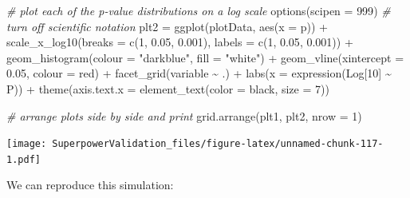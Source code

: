 \documentclass[
]{book}
\newenvironment{Shaded}{\begin{snugshade}}{\end{snugshade}}
\newcommand{\AttributeTok}[1]{\textcolor[rgb]{0.77,0.63,0.00}{#1}}
\newcommand{\CommentTok}[1]{\textcolor[rgb]{0.56,0.35,0.01}{\textit{#1}}}
\newcommand{\DecValTok}[1]{\textcolor[rgb]{0.00,0.00,0.81}{#1}}
\newcommand{\FloatTok}[1]{\textcolor[rgb]{0.00,0.00,0.81}{#1}}
\newcommand{\FunctionTok}[1]{\textcolor[rgb]{0.00,0.00,0.00}{#1}}
\newcommand{\NormalTok}[1]{#1}
\newcommand{\OtherTok}[1]{\textcolor[rgb]{0.56,0.35,0.01}{#1}}
\newcommand{\SpecialCharTok}[1]{\textcolor[rgb]{0.00,0.00,0.00}{#1}}
\newcommand{\StringTok}[1]{\textcolor[rgb]{0.31,0.60,0.02}{#1}}
\begin{document}
\begin{Shaded}
\begin{Highlighting}[]
\CommentTok{\# plot each of the p{-}value distributions on a log scale}
\FunctionTok{options}\NormalTok{(}\AttributeTok{scipen =} \DecValTok{999}\NormalTok{) }\CommentTok{\# \textquotesingle{}turn off\textquotesingle{} scientific notation}
\NormalTok{plt2 }\OtherTok{=} \FunctionTok{ggplot}\NormalTok{(plotData, }\FunctionTok{aes}\NormalTok{(}\AttributeTok{x =}\NormalTok{ p)) }\SpecialCharTok{+}
\FunctionTok{scale\_x\_log10}\NormalTok{(}\AttributeTok{breaks =} \FunctionTok{c}\NormalTok{(}\DecValTok{1}\NormalTok{, }\FloatTok{0.05}\NormalTok{, }\FloatTok{0.001}\NormalTok{),}
\AttributeTok{labels =} \FunctionTok{c}\NormalTok{(}\DecValTok{1}\NormalTok{, }\FloatTok{0.05}\NormalTok{, }\FloatTok{0.001}\NormalTok{)) }\SpecialCharTok{+}
\FunctionTok{geom\_histogram}\NormalTok{(}\AttributeTok{colour =} \StringTok{"darkblue"}\NormalTok{, }\AttributeTok{fill =} \StringTok{"white"}\NormalTok{) }\SpecialCharTok{+}
\FunctionTok{geom\_vline}\NormalTok{(}\AttributeTok{xintercept =} \FloatTok{0.05}\NormalTok{, }\AttributeTok{colour =} \StringTok{\textquotesingle{}red\textquotesingle{}}\NormalTok{) }\SpecialCharTok{+}
\FunctionTok{facet\_grid}\NormalTok{(variable }\SpecialCharTok{\textasciitilde{}}\NormalTok{ .) }\SpecialCharTok{+}
\FunctionTok{labs}\NormalTok{(}\AttributeTok{x =} \FunctionTok{expression}\NormalTok{(Log[}\DecValTok{10}\NormalTok{] }\SpecialCharTok{\textasciitilde{}}\NormalTok{ P)) }\SpecialCharTok{+}
\FunctionTok{theme}\NormalTok{(}\AttributeTok{axis.text.x =} \FunctionTok{element\_text}\NormalTok{(}\AttributeTok{color =} \StringTok{\textquotesingle{}black\textquotesingle{}}\NormalTok{, }\AttributeTok{size =} \DecValTok{7}\NormalTok{))}

\CommentTok{\# arrange plots side by side and print}
\FunctionTok{grid.arrange}\NormalTok{(plt1, plt2, }\AttributeTok{nrow =} \DecValTok{1}\NormalTok{)}
\end{Highlighting}
\end{Shaded}

\texttt{[image: SuperpowerValidation\_files/figure-latex/unnamed-chunk-117-1.pdf]}

We can reproduce this simulation:
\end{document}
